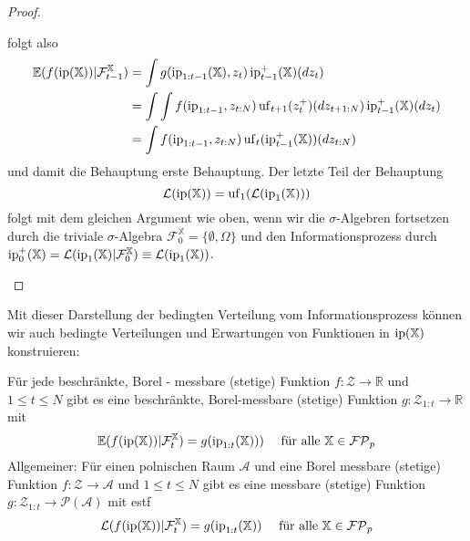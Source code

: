 \begin{proof}
\begin{enumerate}
    folgt also
    \begin{align*}
    \mathbb{E}(f(\operatorname{ip}(\mathbb{X}))\vert \mathcal{F}_{t-1}^\mathbb{X}) &= \int g(\operatorname{ip}_{1:t-1}(\mathbb{X}), z_t) \operatorname{ip}_{t-1}^+(\mathbb{X})(dz_t) \\
    &= \int \int f(\operatorname{ip}_{1:t-1}, z_{t:N}) \operatorname{uf}_{t+1}(z_t^+)(dz_{t+1:N})\operatorname{ip}_{t-1}^+(\mathbb{X})(dz_t) \\
    &= \int f(\operatorname{ip}_{1:t-1}, z_{t:N}) \operatorname{uf}_{t}(\operatorname{ip}_{t-1}^+(\mathbb{X}))(dz_{t:N})
    \end{align*}
    und damit die Behauptung erste Behauptung.
    Der letzte Teil der Behauptung
    $$\mathcal{L}(\operatorname{ip}(\mathbb{X}))=\operatorname{uf}_1(\mathcal{L}(\operatorname{ip}_1(\mathbb{X})))$$
    folgt mit dem gleichen Argument wie oben, wenn wir die $\sigma$-Algebren fortsetzen durch die triviale $\sigma$-Algebra $\mathcal{F}_0^\mathbb{X}=\{\emptyset, \Omega\}$ und den Informationsprozess durch $\operatorname{ip}_0^+(\mathbb{X})=\mathcal{L}(\operatorname{ip}_1(\mathbb{X})\vert \mathcal{F}_0^\mathbb{X}) \equiv \mathcal{L}(\operatorname{ip}_1(\mathbb{X}))$.
\end{enumerate}
\end{proof}
Mit dieser Darstellung der bedingten Verteilung vom Informationsprozess können wir auch bedingte Verteilungen und Erwartungen von Funktionen in $\operatorname{ip}(\mathbb{X})$ konstruieren:
\begin{lemma}\label{thm:self_awareness}
Für jede beschränkte, Borel - messbare (stetige) Funktion $f:\mathcal{Z}\rightarrow \mathbb{R}$ und $1\leq t\leq N$ gibt es eine beschränkte, Borel-messbare (stetige) Funktion $g:\mathcal{Z}_{1:t}\rightarrow \mathbb{R}$ mit 
$$\mathbb{E}(f(\operatorname{ip}(\mathbb{X}))\vert \mathcal{F}_t^\mathbb{X}) = g(\operatorname{ip}_{1:t}(\mathbb{X}))) \quad \text{ für alle }\mathbb{X}\in\mathcal{FP}_p$$
Allgemeiner: Für einen polnischen Raum $\mathcal{A}$ und eine Borel messbare (stetige) Funktion $f:\mathcal{Z}\rightarrow \mathcal{A}$ und $1\leq t\leq N$ gibt es eine messbare (stetige) Funktion $g:\mathcal{Z}_{1:t}\rightarrow \mathcal{P}(\mathcal{A})$ mit estf
$$\mathcal{L}(f(\operatorname{ip}(\mathbb{X}))\vert \mathcal{F}_t^\mathbb{X})=g(\operatorname{ip}_{1:t}(\mathbb{X}))\quad\text{ für alle } \mathbb{X}\in\mathcal{FP}_p$$
\end{lemma}
